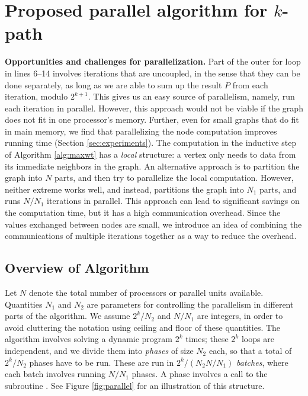 \section{Proposed parallel algorithm \ouralgo{} for $k$-path}
\label{sec:proposed}

\noindent
\textbf{Opportunities and challenges for parallelization.}
Part of the outer for loop in lines 6--14 involves iterations that are uncoupled, in the sense that they can be done separately, as long as we are able to sum up the result $P$ from each iteration, modulo $2^{k+1}$. This gives us an easy source of parallelism, namely, run each iteration in parallel. However, this approach would not be viable if the graph does not fit in one processor's memory. Further, even for small graphs that do fit in main memory, we find that parallelizing the node computation improves running time (Section \ref{sec:experiments}). The computation in the inductive step of Algorithm \ref{alg:maxwt} has a \emph{local} structure: a vertex only needs to data from its immediate neighbors in the graph. An alternative approach is to partition the graph into $N$ parts, and then try to parallelize the local computation. However, neither extreme works well, and instead, \ouralgo{} partitions the graph into $N_1$ parts, and runs $N/N_1$ iterations in parallel. This approach can lead to significant savings on the computation time, but it has a high communication overhead. Since the values exchanged between nodes are small, we introduce an idea of combining the communications of multiple iterations together as a way to reduce the overhead.
 



 


\subsection{Overview of Algorithm \ouralgo{}}
Let $N$ denote the total number of
processors or parallel units available. Quantities $N_1$ and $N_2$ are parameters for controlling the parallelism
in different parts of the algorithm.  
We assume $2^k/N_2$ and $N/N_1$ are integers, in order to avoid cluttering the
notation using ceiling and floor of these quantities.
The algorithm involves solving a dynamic program $2^k$ times; these $2^k$ loops are independent, and we divide them into \emph{phases} of size $N_2$ each, so that a total of $2^k/N_2$ phases have to be run. These are run in $2^k/(N_2N/N_1)$ \emph{batches}, where each batch involves running $N/N_1$ phases. A phase involves a call to the subroutine \parcircuitpath{}.
See Figure \ref{fig:parallel} for an illustration of this structure.


